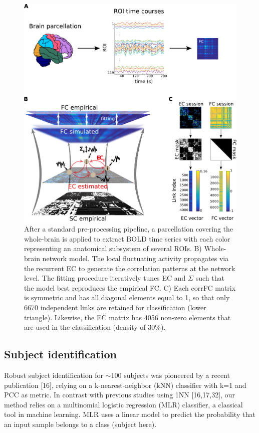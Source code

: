 \documentclass[12pt, a4paper, final, fleqn]{article}
\begin{document}
\begin{figure}[htpb]
	\centering
	\includegraphics[width=0.9\columnwidth]{fig1}
	\caption{After a standard pre-processing pipeline, a parcellation
	covering the whole-brain is applied to extract BOLD time series with each
color representing an anatomical subsystem of several ROIs. 
B) Whole-brain network model. The local
fluctuating activity 
propagates via the recurrent EC to generate the correlation patterns at the
network level. The fitting procedure iteratively tunes EC and $\Sigma$
such that the model best reproduces the empirical FC. C) Each corrFC
matrix is symmetric and has all diagonal elements equal to 1, so that only 6670
independent links are retained for classification (lower
triangle). Likewise, the EC matrix has 4056 non-zero elements that are used in
the classification (density of 30\%).}
	\label{fig:fig1}
\end{figure}

\subsection{Subject identification}

Robust subject
identification for $\sim$100 subjects was pioneered by a recent publication [16],
relying on a k-nearest-neighbor (kNN) classifier with k=1 and PCC as metric.
In contrast with previous studies using 1NN [16,17,32], our method relies on a
multinomial logistic regression (MLR) classifier, a classical tool in machine
learning. MLR uses a linear model to predict the probability that an input
sample belongs to a class (subject here).
\end{document}
